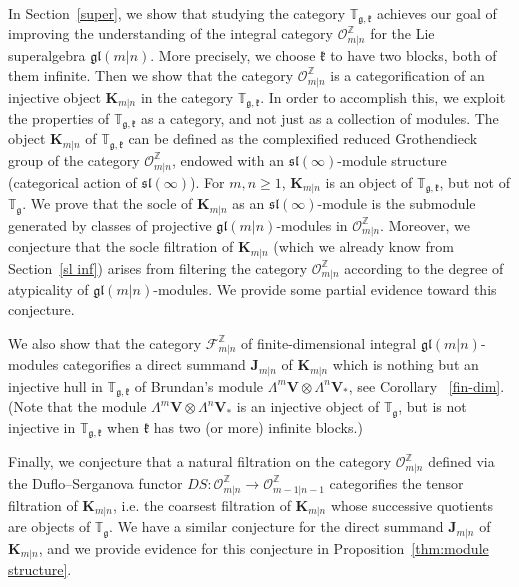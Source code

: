 \documentclass[12pt,oneside,english]{amsart}
\numberwithin{equation}{section}
\numberwithin{figure}{section}
\theoremstyle{plain}
\theoremstyle{plain}
\theoremstyle{remark}
\theoremstyle{definition}
\theoremstyle{plain}
\theoremstyle{remark}
\theoremstyle{definition}
\theoremstyle{plain}
\theoremstyle{plain}
\theoremstyle{definition}
\newcommand{\bV}{\mathbf{V}}
\newcommand{\bK}{\mathbf{K}}
\newcommand{\bJ}{\mathbf{J}}
\newcommand{\fg}{\mathfrak{g}}
\newcommand{\fk}{\mathfrak{k}}
\begin{document}
In Section~\ref{super}, we show that studying the category $\mathbb{T}_{\fg,\fk}$ achieves our goal of improving the understanding of the integral category $\mathcal{O}_{m|n}^{\mathbb{Z}}$ for the Lie superalgebra $\mathfrak{gl}(m|n)$. More precisely, we choose $\fk$ to have two blocks, both of them infinite. Then we show that the category $\mathcal{O}_{m|n}^{\mathbb{Z}}$ is a categorification of an injective object $\bK_{m|n}$ in the category  $\mathbb{T}_{\fg,\fk}$. In order to accomplish this, we exploit the properties of $\mathbb{T}_{\fg,\fk}$ as a category, and not just as a collection of modules.
The object $\bK_{m|n}$ of  $\mathbb{T}_{\fg,\fk}$ can be defined as the complexified reduced Grothendieck group of the category $\mathcal{O}_{m|n}^{\mathbb{Z}}$, endowed with an $\mathfrak{sl}(\infty)$-module structure (categorical action of  $\mathfrak{sl}(\infty)$). For $m,n\geq 1$, $\bK_{m|n}$  is an object of  $\mathbb{T}_{\fg,\fk}$, but not of $\mathbb{T}_{\fg}$.  We prove that the socle of $\bK_{m|n}$ as an  $\mathfrak{sl}(\infty)$-module is the submodule generated by classes of projective $\mathfrak{gl}(m|n)$-modules in  $\mathcal{O}_{m|n}^{\mathbb{Z}}$. Moreover, we conjecture that the socle filtration of $\bK_{m|n}$ (which we already know from Section~\ref{sl inf}) arises from filtering the category $\mathcal{O}_{m|n}^{\mathbb{Z}}$ according to the degree of atypicality of $\mathfrak{gl}(m|n)$-modules. We provide some partial evidence toward this conjecture.

We also show that the category $\mathcal{F}_{m|n}^{\mathbb{Z}}$ of finite-dimensional integral $\mathfrak{gl}(m|n)$-modules categorifies a direct summand $\bJ_{m|n}$ of $\bK_{m|n}$ which is nothing but an injective hull in $\mathbb{T}_{\fg,\fk}$ of Brundan's module  $\Lambda^{m}\bV\otimes\Lambda^{n}\bV_*$, see Corollary ~\ref{fin-dim}.  (Note that the module $\Lambda^{m}\bV\otimes\Lambda^{n}\bV_*$ is an injective object of $\mathbb{T}_{\fg}$, but is not injective in  $\mathbb{T}_{\fg,\fk}$ when $\fk$ has two (or more) infinite blocks.)

Finally, we conjecture that a natural filtration on the category $\mathcal{O}_{m|n}^{\mathbb{Z}}$ defined via the Duflo--Serganova functor $DS:\mathcal{O}_{m|n}^{\mathbb{Z}}\to\mathcal{O}_{m-1|n-1}^{\mathbb{Z}}$ categorifies the tensor filtration of $\bK_{m|n}$, i.e. the coarsest filtration of $\bK_{m|n}$ whose successive quotients are objects of $\mathbb T_{\fg}$. We have a similar conjecture for  the direct summand $\bJ_{m|n}$ of $\bK_{m|n}$, and we provide evidence for this conjecture in Proposition~\ref{thm:module structure}.
\end{document}
